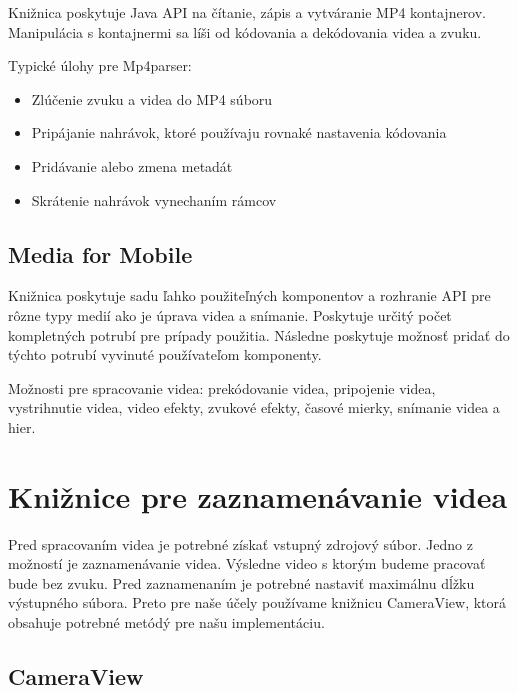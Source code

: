 \documentclass[12pt, oneside]{book}
\begin{document}
\hspace{15pt} Knižnica poskytuje Java API na čítanie, zápis a vytváranie MP4 kontajnerov. Manipulácia s kontajnermi sa líši od kódovania a dekódovania videa a zvuku.

Typické úlohy pre Mp4parser:
\begin{itemize}
\item Zlúčenie zvuku a videa do MP4 súboru
\item Pripájanie nahrávok, ktoré používaju rovnaké nastavenia kódovania
\item Pridávanie alebo zmena metadát
\item Skrátenie nahrávok vynechaním rámcov

\end{itemize}

\subsection{Media for Mobile}

\hspace{15pt} Knižnica poskytuje sadu ľahko použiteľných komponentov a rozhranie API pre rôzne typy medií ako je úprava videa a snímanie. Poskytuje určitý počet kompletných potrubí pre prípady použitia. Následne poskytuje možnosť pridať do týchto potrubí vyvinuté používateľom komponenty.

Možnosti pre spracovanie videa: prekódovanie videa, pripojenie videa, vystrihnutie videa, video efekty, zvukové efekty, časové mierky, snímanie videa a hier.

\section{Knižnice pre zaznamenávanie videa}

\hspace{15pt} Pred spracovaním videa je potrebné získať vstupný zdrojový súbor. Jedno z možností je zaznamenávanie videa. Výsledne video s ktorým budeme pracovať bude bez zvuku. Pred zaznamenaním je potrebné nastaviť maximálnu dĺžku výstupného súbora. Preto pre naše účely používame knižnicu CameraView, ktorá obsahuje potrebné metódý pre našu implementáciu.

\subsection{CameraView}
\end{document}
